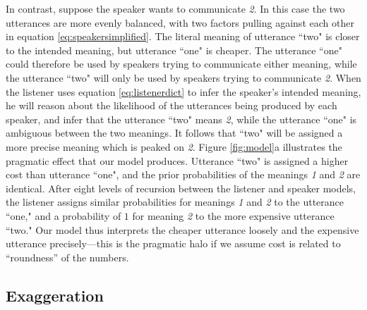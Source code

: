 \documentclass{article} %
\begin{document}
In contrast, suppose the speaker wants to communicate \emph{2}. In this case the two utterances are more evenly balanced, with two factors pulling against each other in equation \ref{eq:speakersimplified}. The literal meaning of utterance ``two" is closer to the intended meaning, but utterance ``one" is cheaper. The utterance ``one" could therefore be used by speakers trying to communicate either meaning, while the utterance ``two" will only be used by speakers trying to communicate \emph{2}. When the listener uses equation \ref{eq:listenerdict} to infer the speaker's intended meaning, he will reason about the likelihood of the utterances being produced by each speaker, and infer that the utterance ``two" means \emph{2}, while the utterance ``one"  is ambiguous between the two meanings. It follows that ``two" will be assigned a more precise meaning which is peaked on \emph{2}.  Figure \ref{fig:model}a illustrates the pragmatic effect that our model produces. Utterance ``two" is assigned a higher cost than utterance ``one", and the prior probabilities of the meanings \emph{1} and \emph{2} are identical. After eight levels of recursion between the listener and speaker models, the listener assigns similar probabilities for meanings \emph{1} and \emph{2} to the utterance ``one," and a probability of $1$ for meaning \emph{2} to the more expensive utterance ``two." Our model thus interprets the cheaper utterance loosely and the expensive utterance precisely---this is the pragmatic halo if we assume cost is related to ``roundness'' of the numbers.


\subsection{Exaggeration}
\end{document}
